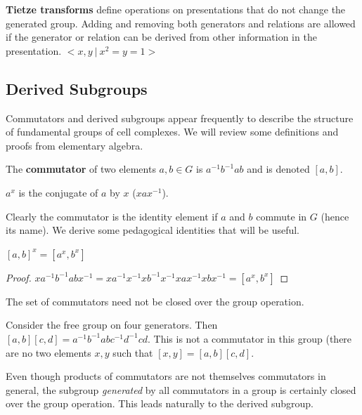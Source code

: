 \documentclass[10pt]{article}
\begin{document}
\begin{note}
	\textbf{Tietze transforms} define operations on presentations that do not
	change the generated group. Adding and removing both generators and relations
	are allowed if the generator or relation can be derived from other
	information in the presentation.
	$< x, y ~|~ x^2 = y = 1>$
\end{note}

\subsection{Derived Subgroups}

Commutators and derived subgroups appear frequently to describe the structure
of fundamental groups of cell complexes. We will review some definitions and
proofs from elementary algebra.

\begin{definition}
	The \textbf{commutator} of two elements $a, b \in G$ is $a^{-1}b^{-1}ab$ and
	is denoted $[a, b]$.
\end{definition}

\begin{definition}
	$a^x$ is the conjugate of $a$ by $x$ ($xax^{-1}$).
\end{definition}

Clearly the commutator is the identity element if $a$ and $b$ commute in $G$
(hence its name). We derive some pedagogical identities that will be useful.

\begin{definition}
	$[a, b]^x = [a^x,b^x]$
\end{definition}
\begin{proof}
	$xa^{-1}b^{-1}abx^{-1} = xa^{-1}x^{-1}xb^{-1}x^{-1}xax^{-1}xbx^{-1} = [a^x,b^x]$
\end{proof}

\begin{note}
	The set of commutators need not be closed over the group operation.

	Consider the free group on four generators. Then $[a, b][c, d] =
	a^{-1}b^{-1}abc^{-1}d^{-1}cd$. This is not a commutator in this group (there
	are no two elements $x, y$ such that $[x, y] = [a, b][c, d]$.
\end{note}

Even though products of commutators are not themselves commutators in general,
the subgroup \textit{generated} by all commutators in a group is certainly closed over
the group operation. This leads naturally to the derived subgroup.
\end{document}
